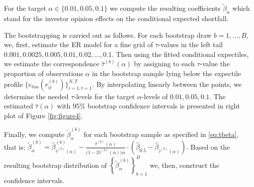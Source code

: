 \documentclass[]{article}
\begin{document}
For the target \(\alpha\in\{0.01,0.05,0.1\}\) we compute the resulting coefficients \(\tilde\beta_\alpha\) which stand for the investor opinion effects on the conditional expected shortfall. 

The bootstrapping is carried out as follows. For each bootstrap draw \(b=1,\ldots, B\), we, first, estimate the ER model for a fine grid of \(\tau\)-values in the left tail \(0.001,0.0025,0.005,0.01,0.02,\ldots,0.1\). Then using the fitted conditional expectiles, we estimate the correspondence \(\hat\tau^{(b)}(\alpha)\) by assigning to each \(\tau\)-value the proportion of observations \(\alpha\) in the bootstrap sample lying below the expectile profile \(\{e_{tau}(r^{(b)}_{it})\}_{i=1,t=1}^{N,T}\). By interpolating linearly between the points, we determine the needed \(\tau\)-levels for the target \(\alpha\)-levels of \(0.01,0.05,0.1\). The estimated \(\hat\tau(\alpha)\) with \(95\%\) bootstrap confidence intervals is presented in right plot of Figure \ref{fig:figure4}.

Finally, we compute \(\tilde\beta^{(b)}_\alpha\) for each bootstrap sample as specified in \eqref{eq:tbeta}, that is:
$\tilde\beta^{(b)}_\alpha = \hat \beta^{(b)}_{\hat\tau^{(b)}(\alpha)} - \frac{\hat\tau^{(b)}(\alpha)}{\big(1-2\hat\tau^{(b)}(\alpha)\big)\alpha}\cdot \left(\hat\beta_{0.5} -\hat \beta_{\hat\tau^{(b)}(\alpha)}\right).$
Based on the resulting bootstrap distribution of \(\left\{\tilde\beta^{(b)}_\alpha\right\}_{b=1}^B\) we, then, construct the confidence intervals.
\end{document}
